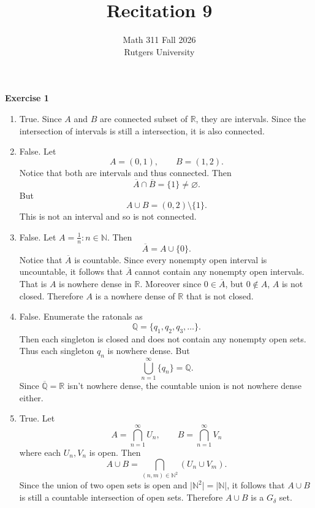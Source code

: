 \documentclass[12pt]{article}
\title{Recitation 9}
\author{Math 311 Fall 2026 \\ Rutgers University}
\date{}
\begin{document}
\maketitle

\textbf{Exercise 1}
\begin{enumerate}[label=(\alph*)]
    \item True. Since \( A \) and \( B \) are connected subset of \( \mathbb{R} \), they are intervals. Since the intersection of intervals is still a intersection, it is also connected.
    \item False. Let
          \[
              A = (0,1), \qquad B = (1,2).
          \]
          Notice that both are intervals and thus connected.
          Then
          \[
              \overline{A} \cap \overline{B} = \{1\} \neq \varnothing .
          \]
          But
          \[
              A \cup B = (0,2) \setminus \{1\}.
          \]
          This is not an interval and so is not connected.

    \item False. Let \( A = {\frac{1}{n} : n \in \mathbb{N}} \). Then
          \[
              \overline{A} = A \cup \{0\}.
          \]
          Notice that \( \overline{A} \) is countable. Since every nonempty open interval is uncountable, it follows that \( \overline{A} \) cannot contain any nonempty open intervals. That is \( A \) is nowhere dense in \( \mathbb{R} \). Moreover since \( 0 \in \overline{A} \), but \( 0 \not \in A \), \( A \) is not closed. Therefore \( A \) is a nowhere dense of \( \mathbb{R} \) that is not closed.


    \item False. Enumerate the ratonals as
          \[
              \mathbb{Q} = \{q_1, q_2, q_3, \dots \}.
          \]
          Then each singleton is closed and does not contain any nonempty open sets. Thus each singleton \( q_n \) is nowhere dense. But
          \[
              \bigcup_{n=1}^{\infty} \{q_n\} = \mathbb{Q}.
          \]
          Since \( \overline{\mathbb{Q}} = \mathbb{R} \) isn't nowhere dense, the countable union is not nowhere dense either.


    \item True. Let
          \[
              A = \bigcap_{n=1}^{\infty} U_n, \qquad B = \bigcap_{n=1}^{\infty} V_n
          \]
          where each \( U_n, V_n \) is open.
          Then
          \[
              A \cup B = \bigcap_{(n,m) \in \mathbb{N}^2} (U_n \cup V_m).
          \]
          Since the union of two open sets is open and \( \vert \mathbb{N}^2 \vert = \vert \mathbb{N} \vert \), it follows that \( A \cup B \) is still a countable intersection of open sets. Therefore \( A \cup B \) is a \( G_\delta  \) set.


\end{enumerate}
\end{document}
